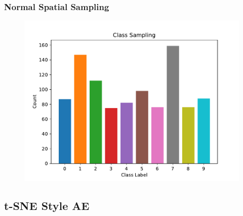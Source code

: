 \documentclass[10pt, usenames, dvipsnames, table]{beamer}
\begin{document}
\begin{frame}
  \frametitle{Normal Spatial Sampling}
  \begin{figure}
    \centering
    \includegraphics[width=\linewidth]
    {models/mnist_vae_e300_L2_b64/multi-normal_sampling_distribution_1000}
    \caption{}
    \label{}
  \end{figure}
\end{frame}

\subsection{t-SNE Style AE}
\end{document}
